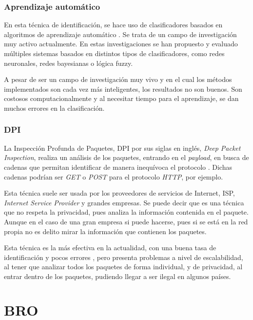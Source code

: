 \subsubsection{Aprendizaje automático}

En esta técnica de identificación, se hace uso de clasificadores basados en algoritmos de aprendizaje automático \cite{learning}. Se 
trata de un campo de investigación muy activo actualmente. En estas investigaciones se han propuesto y evaluado múltiples sistemas 
basados en distintos tipos de clasificadores, como redes neuronales, redes bayesianas o lógica fuzzy.

\intro A pesar de ser un campo de investigación muy vivo y en el cual los métodos implementados son cada vez más inteligentes, los 
resultados no son buenos. Son costosos computacionalmente y al necesitar tiempo para el aprendizaje, se dan muchos errores en la 
clasificación.

\subsubsection{DPI}

La Inspección Profunda de Paquetes, DPI por sus siglas en inglés, \textit{Deep Packet Inspection}, realiza un análisis de los 
paquetes, entrando en el \textit{payload}, en busca de cadenas que permitan identificar de manera inequívoca el protocolo \cite{payload}. 
Dichas cadenas podrían ser \textit{GET} o \textit{POST} para el protocolo \textit{HTTP}, por ejemplo.

\intro Esta técnica suele ser usada por los proveedores de servicios de Internet, ISP, \textit{Internet Service Provider} y grandes 
empresas. Se puede decir que es una técnica que no respeta la privacidad, pues analiza la información contenida en el paquete. Aunque 
en el caso de una gran empresa si puede hacerse, pues si se está en la red propia no es delito mirar la información que contienen los 
paquetes.

\intro Esta técnica es la más efectiva en la actualidad, con una buena tasa de identificación y pocos errores \cite{dpiaproximacion}, 
pero presenta problemas a nivel de escalabilidad, al tener que analizar todos los paquetes de forma individual, y de privacidad, al 
entrar dentro de los paquetes, pudiendo llegar a ser ilegal en algunos países.

\section{BRO}

